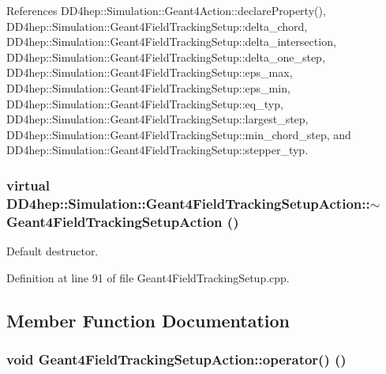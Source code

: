 References DD4hep::Simulation::Geant4Action::declareProperty(), DD4hep::Simulation::Geant4FieldTrackingSetup::delta\_\-chord, DD4hep::Simulation::Geant4FieldTrackingSetup::delta\_\-intersection, DD4hep::Simulation::Geant4FieldTrackingSetup::delta\_\-one\_\-step, DD4hep::Simulation::Geant4FieldTrackingSetup::eps\_\-max, DD4hep::Simulation::Geant4FieldTrackingSetup::eps\_\-min, DD4hep::Simulation::Geant4FieldTrackingSetup::eq\_\-typ, DD4hep::Simulation::Geant4FieldTrackingSetup::largest\_\-step, DD4hep::Simulation::Geant4FieldTrackingSetup::min\_\-chord\_\-step, and DD4hep::Simulation::Geant4FieldTrackingSetup::stepper\_\-typ.\hypertarget{class_d_d4hep_1_1_simulation_1_1_geant4_field_tracking_setup_action_aec9b4efefc6cce22342b63fd91a5ef8b}{
\subsubsection[{$\sim$Geant4FieldTrackingSetupAction}]{\setlength{\rightskip}{0pt plus 5cm}virtual DD4hep::Simulation::Geant4FieldTrackingSetupAction::$\sim$Geant4FieldTrackingSetupAction ()}}
\label{class_d_d4hep_1_1_simulation_1_1_geant4_field_tracking_setup_action_aec9b4efefc6cce22342b63fd91a5ef8b}


Default destructor. 

Definition at line 91 of file Geant4FieldTrackingSetup.cpp.

\subsection{Member Function Documentation}
\hypertarget{class_d_d4hep_1_1_simulation_1_1_geant4_field_tracking_setup_action_a5412b262d35a196e35807b2a3fe2463b}{
\subsubsection[{operator()}]{\setlength{\rightskip}{0pt plus 5cm}void Geant4FieldTrackingSetupAction::operator() ()}}
\label{class_d_d4hep_1_1_simulation_1_1_geant4_field_tracking_setup_action_a5412b262d35a196e35807b2a3fe2463b}


